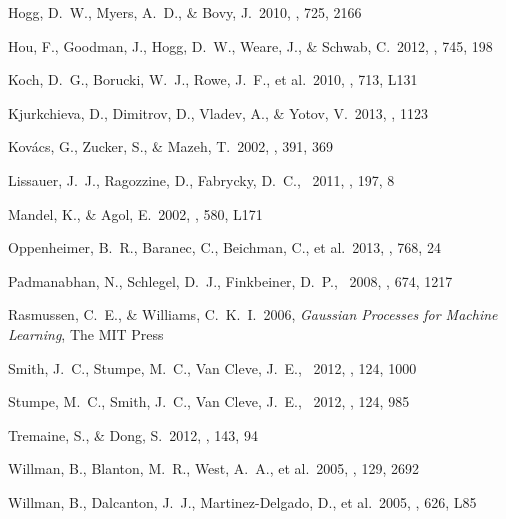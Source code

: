 \documentclass[letterpaper,12pt,preprint]{hack_aastex}
\begin{document}
\begin{thebibliography}{}
Hogg, D.~W., Myers, A.~D., \& Bovy, J.\ 2010, \apj, 725, 2166

Hou, F., Goodman, J., Hogg, D.~W., Weare, J., \& Schwab, C.\ 2012, \apj, 745, 198


Koch, D.~G., Borucki, W.~J., Rowe, J.~F., et al.\ 2010, \apjl,
713, L131

Kjurkchieva, D., Dimitrov, D., Vladev, A., \& Yotov, V.\ 2013, \mnras,
1123

Kov{\'a}cs, G., Zucker, S., \& Mazeh, T.\ 2002, \aap, 391, 369

Lissauer, J.~J., Ragozzine, D., Fabrycky, D.~C., \etal\ 2011, \apjs, 197, 8

Mandel, K., \& Agol, E.\ 2002, \apjl, 580, L171

Oppenheimer, B.~R., Baranec, C., Beichman, C., et al.\ 2013, \apj, 768, 24

Padmanabhan, N., Schlegel, D.~J., Finkbeiner, D.~P., \etal\ 2008, \apj, 674, 1217

Rasmussen, C.~E., \& Williams, C.~K.~I.\ 2006, \emph{Gaussian Processes for
Machine Learning}, The MIT Press

Smith, J.~C., Stumpe, M.~C., Van Cleve, J.~E., \etal\ 2012, \pasp, 124, 1000

Stumpe, M.~C., Smith, J.~C., Van Cleve, J.~E., \etal\ 2012, \pasp, 124, 985

Tremaine, S., \& Dong, S.\ 2012, \aj, 143, 94

Willman, B., Blanton, M.~R., West, A.~A., et al.\ 2005, \aj, 129, 2692

Willman, B., Dalcanton, J.~J., Martinez-Delgado, D., et al.\ 2005, \apjl, 626, L85
\end{thebibliography}
\end{document}
